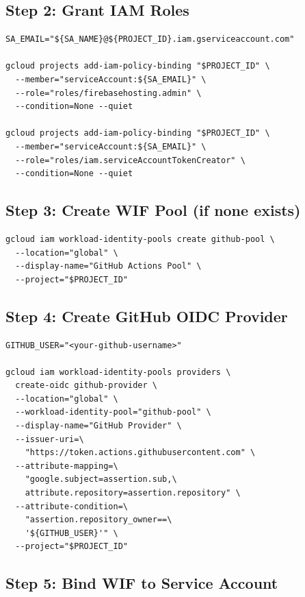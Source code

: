 \documentclass[11pt,a4paper]{article}
\theoremstyle{plainref}
\begin{document}
\subsection{Step 2: Grant IAM Roles}

\begin{verbatim}
SA_EMAIL="${SA_NAME}@${PROJECT_ID}.iam.gserviceaccount.com"

gcloud projects add-iam-policy-binding "$PROJECT_ID" \
  --member="serviceAccount:${SA_EMAIL}" \
  --role="roles/firebasehosting.admin" \
  --condition=None --quiet

gcloud projects add-iam-policy-binding "$PROJECT_ID" \
  --member="serviceAccount:${SA_EMAIL}" \
  --role="roles/iam.serviceAccountTokenCreator" \
  --condition=None --quiet
\end{verbatim}

\subsection{Step 3: Create WIF Pool (if none exists)}

\begin{verbatim}
gcloud iam workload-identity-pools create github-pool \
  --location="global" \
  --display-name="GitHub Actions Pool" \
  --project="$PROJECT_ID"
\end{verbatim}

\subsection{Step 4: Create GitHub OIDC Provider}

\begin{verbatim}
GITHUB_USER="<your-github-username>"

gcloud iam workload-identity-pools providers \
  create-oidc github-provider \
  --location="global" \
  --workload-identity-pool="github-pool" \
  --display-name="GitHub Provider" \
  --issuer-uri=\
    "https://token.actions.githubusercontent.com" \
  --attribute-mapping=\
    "google.subject=assertion.sub,\
    attribute.repository=assertion.repository" \
  --attribute-condition=\
    "assertion.repository_owner==\
    '${GITHUB_USER}'" \
  --project="$PROJECT_ID"
\end{verbatim}

\subsection{Step 5: Bind WIF to Service Account}
\end{document}
